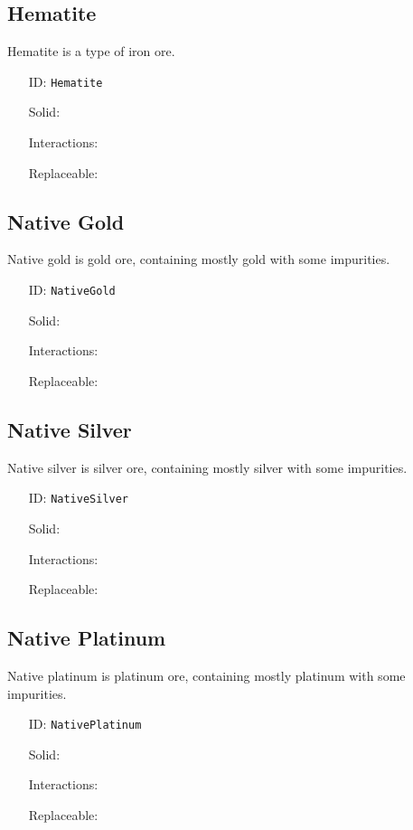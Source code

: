 \subsection{Hematite}\label{subsec:blocks_hematite}
Hematite is a type of iron ore.
\newline
\begin{itemize}[nosep]
\item[ID:] \texttt{Hematite}
\item[Solid:]  \Checkmark \item[Interactions:]  \XSolidBrush \item[Replaceable:]  \XSolidBrush \end{itemize}

\subsection{Native Gold}\label{subsec:blocks_native gold}
Native gold is gold ore, containing mostly gold with some impurities.
\newline
\begin{itemize}[nosep]
\item[ID:] \texttt{NativeGold}
\item[Solid:]  \Checkmark \item[Interactions:]  \XSolidBrush \item[Replaceable:]  \XSolidBrush \end{itemize}

\subsection{Native Silver}\label{subsec:blocks_native silver}
Native silver is silver ore, containing mostly silver with some impurities.
\newline
\begin{itemize}[nosep]
\item[ID:] \texttt{NativeSilver}
\item[Solid:]  \Checkmark \item[Interactions:]  \XSolidBrush \item[Replaceable:]  \XSolidBrush \end{itemize}

\subsection{Native Platinum}\label{subsec:blocks_native platinum}
Native platinum is platinum ore, containing mostly platinum with some impurities.
\newline
\begin{itemize}[nosep]
\item[ID:] \texttt{NativePlatinum}
\item[Solid:]  \Checkmark \item[Interactions:]  \XSolidBrush \item[Replaceable:]  \XSolidBrush \end{itemize}

